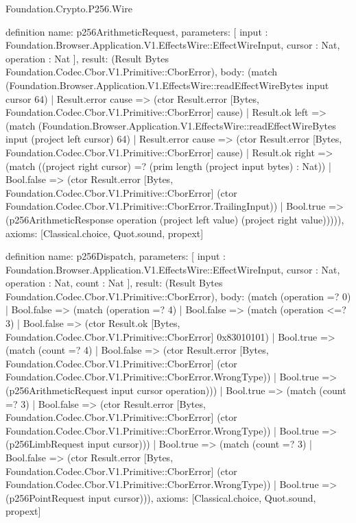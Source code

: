 \begin{lexlean}{Foundation.Crypto.P256.Wire}
\begin{semanticmodule}
definition{
  name: p256ArithmeticRequest,
  parameters: [
    input : Foundation.Browser.Application.V1.EffectsWire::EffectWireInput,
    cursor : Nat,
    operation : Nat
  ],
  result: (Result Bytes Foundation.Codec.Cbor.V1.Primitive::CborError),
  body: (match (Foundation.Browser.Application.V1.EffectsWire::readEffectWireBytes input cursor 64)
    | Result.error cause => (ctor Result.error [Bytes, Foundation.Codec.Cbor.V1.Primitive::CborError] cause)
    | Result.ok left => (match (Foundation.Browser.Application.V1.EffectsWire::readEffectWireBytes input (project left cursor) 64)
      | Result.error cause => (ctor Result.error [Bytes, Foundation.Codec.Cbor.V1.Primitive::CborError] cause)
      | Result.ok right => (match ((project right cursor) =? (prim length (project input bytes) : Nat))
        | Bool.false => (ctor Result.error [Bytes, Foundation.Codec.Cbor.V1.Primitive::CborError] (ctor Foundation.Codec.Cbor.V1.Primitive::CborError.TrailingInput))
        | Bool.true => (p256ArithmeticResponse operation (project left value) (project right value))))),
  axioms: [Classical.choice, Quot.sound, propext]
}

definition{
  name: p256Dispatch,
  parameters: [
    input : Foundation.Browser.Application.V1.EffectsWire::EffectWireInput,
    cursor : Nat,
    operation : Nat,
    count : Nat
  ],
  result: (Result Bytes Foundation.Codec.Cbor.V1.Primitive::CborError),
  body: (match (operation =? 0)
    | Bool.false => (match (operation =? 4)
      | Bool.false => (match (operation <=? 3)
        | Bool.false => (ctor Result.ok [Bytes, Foundation.Codec.Cbor.V1.Primitive::CborError] 0x83010101)
        | Bool.true => (match (count =? 4)
          | Bool.false => (ctor Result.error [Bytes, Foundation.Codec.Cbor.V1.Primitive::CborError] (ctor Foundation.Codec.Cbor.V1.Primitive::CborError.WrongType))
          | Bool.true => (p256ArithmeticRequest input cursor operation)))
      | Bool.true => (match (count =? 3)
        | Bool.false => (ctor Result.error [Bytes, Foundation.Codec.Cbor.V1.Primitive::CborError] (ctor Foundation.Codec.Cbor.V1.Primitive::CborError.WrongType))
        | Bool.true => (p256LimbRequest input cursor)))
    | Bool.true => (match (count =? 3)
      | Bool.false => (ctor Result.error [Bytes, Foundation.Codec.Cbor.V1.Primitive::CborError] (ctor Foundation.Codec.Cbor.V1.Primitive::CborError.WrongType))
      | Bool.true => (p256PointRequest input cursor))),
  axioms: [Classical.choice, Quot.sound, propext]
}


\end{semanticmodule}
\end{lexlean}
